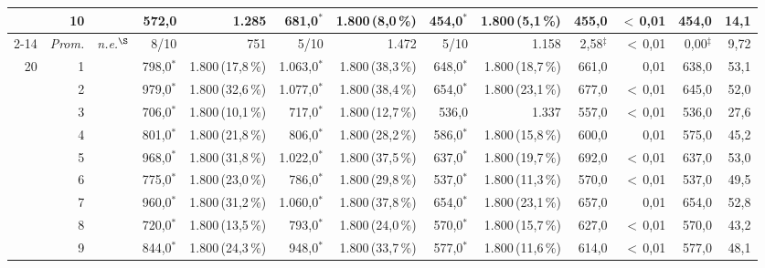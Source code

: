 \documentclass[11pt,a4paper]{article}
\begin{document}
\begin{table}[htbp]
{\begin{tabular}{rr rr rr rr rr rr rr}
 & 10 &  &  & 572{,}0 & 1.285 & 681{,}0$^{*}$ & 1.800\,{\scriptsize(8{,}0\,\%)} & 454{,}0$^{*}$ & 1.800\,{\scriptsize(5{,}1\,\%)} & 455{,}0 & $<$\,0{,}01 & 454{,}0 & 14{,}1 \\
\cmidrule(l){2-14}
 & \emph{Prom.} & \multicolumn{2}{c}{\textit{n.e.}$^{\S}$} & 8/10 & 751 & 5/10 & 1.472 & 5/10 & 1.158 & 2{,}58$^{\ddagger}$ & $<$\,0{,}01 & 0{,}00$^{\ddagger}$ & 9{,}72 \\
\midrule
20 & 1 &  &  & 798{,}0$^{*}$ & 1.800\,{\scriptsize(17{,}8\,\%)} & 1.063{,}0$^{*}$ & 1.800\,{\scriptsize(38{,}3\,\%)} & 648{,}0$^{*}$ & 1.800\,{\scriptsize(18{,}7\,\%)} & 661{,}0 & 0{,}01 & 638{,}0 & 53{,}1 \\
 & 2 &  &  & 979{,}0$^{*}$ & 1.800\,{\scriptsize(32{,}6\,\%)} & 1.077{,}0$^{*}$ & 1.800\,{\scriptsize(38{,}4\,\%)} & 654{,}0$^{*}$ & 1.800\,{\scriptsize(23{,}1\,\%)} & 677{,}0 & $<$\,0{,}01 & 645{,}0 & 52{,}0 \\
 & 3 &  &  & 706{,}0$^{*}$ & 1.800\,{\scriptsize(10{,}1\,\%)} & 717{,}0$^{*}$ & 1.800\,{\scriptsize(12{,}7\,\%)} & 536{,}0 & 1.337 & 557{,}0 & $<$\,0{,}01 & 536{,}0 & 27{,}6 \\
 & 4 &  &  & 801{,}0$^{*}$ & 1.800\,{\scriptsize(21{,}8\,\%)} & 806{,}0$^{*}$ & 1.800\,{\scriptsize(28{,}2\,\%)} & 586{,}0$^{*}$ & 1.800\,{\scriptsize(15{,}8\,\%)} & 600{,}0 & 0{,}01 & 575{,}0 & 45{,}2 \\
 & 5 &  &  & 968{,}0$^{*}$ & 1.800\,{\scriptsize(31{,}8\,\%)} & 1.022{,}0$^{*}$ & 1.800\,{\scriptsize(37{,}5\,\%)} & 637{,}0$^{*}$ & 1.800\,{\scriptsize(19{,}7\,\%)} & 692{,}0 & $<$\,0{,}01 & 637{,}0 & 53{,}0 \\
 & 6 &  &  & 775{,}0$^{*}$ & 1.800\,{\scriptsize(23{,}0\,\%)} & 786{,}0$^{*}$ & 1.800\,{\scriptsize(29{,}8\,\%)} & 537{,}0$^{*}$ & 1.800\,{\scriptsize(11{,}3\,\%)} & 570{,}0 & $<$\,0{,}01 & 537{,}0 & 49{,}5 \\
 & 7 &  &  & 960{,}0$^{*}$ & 1.800\,{\scriptsize(31{,}2\,\%)} & 1.060{,}0$^{*}$ & 1.800\,{\scriptsize(37{,}8\,\%)} & 654{,}0$^{*}$ & 1.800\,{\scriptsize(23{,}1\,\%)} & 657{,}0 & 0{,}01 & 654{,}0 & 52{,}8 \\
 & 8 &  &  & 720{,}0$^{*}$ & 1.800\,{\scriptsize(13{,}5\,\%)} & 793{,}0$^{*}$ & 1.800\,{\scriptsize(24{,}0\,\%)} & 570{,}0$^{*}$ & 1.800\,{\scriptsize(15{,}7\,\%)} & 627{,}0 & $<$\,0{,}01 & 570{,}0 & 43{,}2 \\
 & 9 &  &  & 844{,}0$^{*}$ & 1.800\,{\scriptsize(24{,}3\,\%)} & 948{,}0$^{*}$ & 1.800\,{\scriptsize(33{,}7\,\%)} & 577{,}0$^{*}$ & 1.800\,{\scriptsize(11{,}6\,\%)} & 614{,}0 & $<$\,0{,}01 & 577{,}0 & 48{,}1 \\

\end{tabular}}
\end{table}
\end{document}
